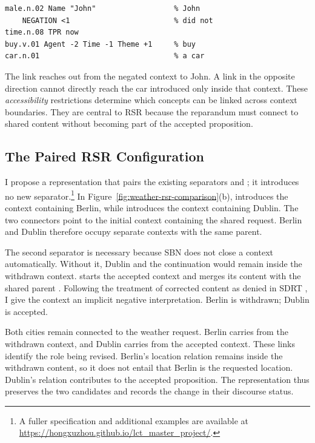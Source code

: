 \begin{lstlisting}[style=sbn]
male.n.02 Name "John"                  % John
    NEGATION <1                        % did not
time.n.08 TPR now
buy.v.01 Agent -2 Time -1 Theme +1     % buy
car.n.01                               % a car
\end{lstlisting}

The  link reaches out from the negated context to John. A
link in the opposite direction cannot directly reach the car introduced only
inside that context. These \emph{accessibility} restrictions determine which
concepts can be linked across context boundaries. They are central to RSR
because the reparandum must connect to shared content without becoming part of
the accepted proposition.

\subsection{The Paired RSR Configuration}
\label{sec:paired-configuration}

I propose a representation that pairs the existing separators
 and ; it introduces no new
separator.\footnote{A fuller
specification and additional examples are available at
\url{https://hongxuzhou.github.io/lct_master_project/}.} In
Figure~\ref{fig:weather-rsr-comparison}(b),  introduces the
context containing Berlin, while  introduces the context
containing Dublin. The two connectors point to the initial context containing
the shared request. Berlin and Dublin therefore occupy separate contexts with
the same parent.

The second separator is necessary because SBN does not close a context
automatically. Without it, Dublin and the continuation would remain inside
the withdrawn context.  starts the accepted context and
merges its content with the shared parent
\citep{bosSequenceNotationCatching2023}. Following the treatment of corrected
content as denied in SDRT
\citep{lascaridesAgreementDisputesCommitments2009}, I give the
 context an implicit negative interpretation. Berlin is
withdrawn; Dublin is accepted.

Both cities remain connected to the weather request. Berlin carries
 from the withdrawn context, and Dublin carries
 from the accepted context. These links identify the
role being revised. Berlin's location relation remains inside the withdrawn
content, so it does not entail that Berlin is the requested location. Dublin's
relation contributes to the accepted proposition. The representation thus
preserves the two candidates and records the change in their discourse status.

